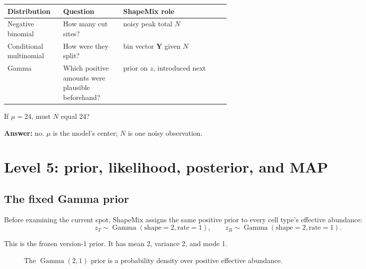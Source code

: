 \documentclass[11pt]{article}
\newcommand{\Gam}{\operatorname{Gamma}}
\begin{document}
\begin{center}
\begin{tabularx}{0.91\linewidth}{L{0.25\linewidth}L{0.27\linewidth}X}
\toprule
Distribution & Question & ShapeMix role \\
\midrule
Negative binomial & How many cut sites? & noisy peak total \(N\) \\
Conditional multinomial & How were they split? & bin vector \(\boldsymbol Y\) given \(N\) \\
Gamma & Which positive amounts were plausible beforehand? & prior on \(z\), introduced next \\
\bottomrule
\end{tabularx}
\end{center}

\begin{checkpoint}
If \(\mu=24\), must \(N\) equal 24?

\textbf{Answer:} no. \(\mu\) is the model's center; \(N\) is one noisy observation.
\end{checkpoint}

\section{Level 5: prior, likelihood, posterior, and MAP}

\subsection{The fixed Gamma prior}

Before examining the current spot, ShapeMix assigns the same positive prior to
every cell type's effective abundance:
\[
\boxed{z_T\sim\Gam(\text{shape}=2,\text{rate}=1),\qquad
z_B\sim\Gam(\text{shape}=2,\text{rate}=1).}
\]

This is the frozen version-1 prior. It has mean 2, variance 2, and mode 1.

\begin{figure}[H]
\centering
{}
\caption{The \(\Gam(2,1)\) prior is a probability density over positive effective abundance.}
\end{figure}
\end{document}
